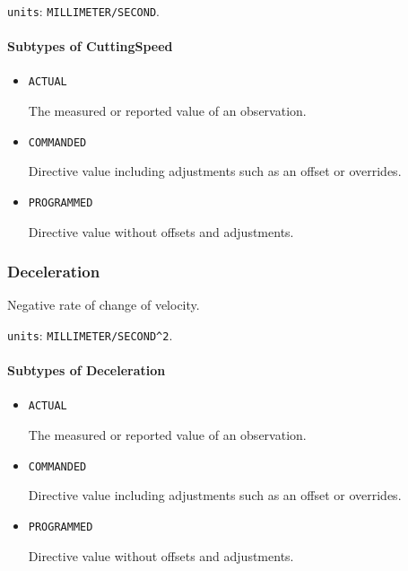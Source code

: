 \texttt{units}: \texttt{MILLIMETER/SECOND}.

\paragraph{Subtypes of CuttingSpeed}\mbox{}
\label{sec:Subtypes of CuttingSpeed}

\begin{itemize}

\item \texttt{ACTUAL}


The measured or reported value of an \gls{observation}.

\item \texttt{COMMANDED}


Directive value including adjustments such as an offset or overrides.

\item \texttt{PROGRAMMED}


Directive value without offsets and adjustments.


\end{itemize}






\subsubsection{Deceleration}
\label{sec:Deceleration}



Negative rate of change of velocity.


\texttt{units}: \texttt{MILLIMETER/SECOND\^{}2}.

\paragraph{Subtypes of Deceleration}\mbox{}
\label{sec:Subtypes of Deceleration}

\begin{itemize}

\item \texttt{ACTUAL}


The measured or reported value of an \gls{observation}.

\item \texttt{COMMANDED}


Directive value including adjustments such as an offset or overrides.

\item \texttt{PROGRAMMED}


Directive value without offsets and adjustments.


\end{itemize}






